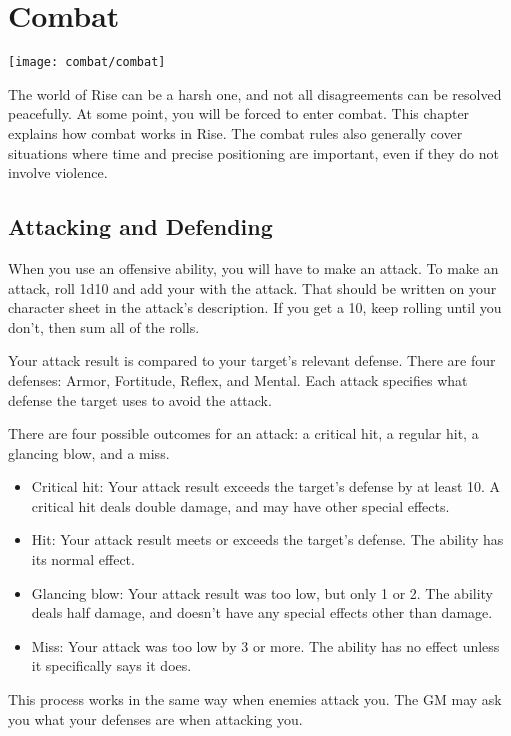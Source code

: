 \chapter{Combat}\label{Combat}
\texttt{[image: combat/combat]}

The world of Rise can be a harsh one, and not all disagreements can be resolved peacefully.
At some point, you will be forced to enter combat.
This chapter explains how combat works in Rise.
The combat rules also generally cover situations where time and precise positioning are important, even if they do not involve violence.

\section{Attacking and Defending}
  When you use an offensive ability, you will have to make an attack.
  To make an attack, roll 1d10 and add your  with the attack.
  That should be written on your character sheet in the attack's description.
  If you get a 10, keep rolling until you don't, then sum all of the rolls.

  Your attack result is compared to your target's relevant defense.
  There are four defenses: Armor, Fortitude, Reflex, and Mental.
  Each attack specifies what defense the target uses to avoid the attack.

  There are four possible outcomes for an attack: a critical hit, a regular hit, a glancing blow, and a miss.
  \begin{itemize}
    \item Critical hit: Your attack result exceeds the target's defense by at least 10.
      A critical hit deals double damage, and may have other special effects.
    \item Hit: Your attack result meets or exceeds the target's defense.
      The ability has its normal effect.
    \item Glancing blow: Your attack result was too low, but only 1 or 2.
      The ability deals half damage, and doesn't have any special effects other than damage.
    \item Miss: Your attack was too low by 3 or more.
      The ability has no effect unless it specifically says it does.
  \end{itemize}

  This process works in the same way when enemies attack you.
  The GM may ask you what your defenses are when attacking you.

